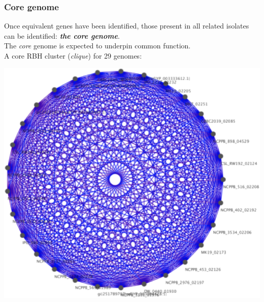 
\begin{frame}
  \frametitle{Core genome}
  Once equivalent genes have been identified, those present in all related isolates can be identified: \textbf{\textit{the core genome}}.\\
  The \textit{core} genome is expected to underpin common function.\\
  A core RBH cluster (\textit{clique}) for 29 genomes:
  \begin{center}
      \includegraphics[height=0.55\textheight]{images/core_cluster} 
  \end{center}
\end{frame}

